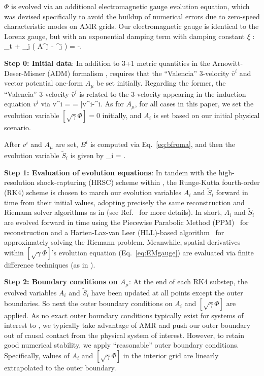 $\Phi$ is evolved via an additional electromagnetic gauge evolution
equation, which was devised specifically to avoid the buildup of
numerical errors due to zero-speed characteristic modes \cite{Etienne:2011re} on AMR grids. 
Our electromagnetic gauge is identical to the Lorenz gauge, but with an exponential
damping term with damping constant $\xi$ \cite{Farris:2012ux}:
\beq
\label{eq:EMgauge}
\partial_t \left[\sqrt{\gamma} \Phi \right] +
\partial_j \left(\alpha \sqrt{\gamma} A^j - \beta^j \left[\sqrt{\gamma} \Phi \right]\right)
= -\xi \alpha \left[\sqrt{\gamma}\Phi\right].
\eeq

{\bf Step 0: Initial data}: In addition to 3+1 metric quantities in
the Arnowitt-Deser-Misner (ADM) formalism \cite{Arnowitt:1959},
\GiR{} requires that the ``Valencia'' 3-velocity $\bar{v}^i$ and vector
potential one-form $A_\mu$ be set initially. Regarding the former, the
``Valencia'' 3-velocity $\bar{v}^i$ is related to the 3-velocity
appearing in the induction equation $v^i$ via 
\beq
v^i =  = \alpha \bar{v}^i-\beta^i.
\eeq
As for $A_\mu$, for all cases in this paper, we set the evolution
variable $\left[\sqrt{\gamma}\Phi\right]=0$ initially, and $A_i$ is
set based on our initial physical scenario.

After $v^i$ and $A_\mu$ are set, $B^i$ is computed via
Eq.~\ref{eq:bfroma}, and then the evolution variable $\tilde{S}_i$ is
given by
\beq
\label{eq:Sfromv}
_i = .
\eeq

{\bf Step 1: Evaluation of evolution equations}: In tandem with the
high-resolution shock-capturing (HRSC) scheme within \GiR, the
Runge-Kutta fourth-order (RK4) scheme is chosen to march
our evolution variables $A_i$ and $\tilde{S}_i$ forward in time from
their initial values, adopting precisely the same reconstruction and
Riemann solver algorithms as in \IGM{}  (see Ref.~\cite{Etienne:2015cea}
for more details). In short, $A_i$ and $\tilde{S}_i$ are evolved
forward in time using the Piecewise Parabolic Method
(PPM)~\cite{Colella:1984} for reconstruction and a Harten-Lax-van Leer
(HLL)-based algorithm~\cite{Harten:1983,DelZanna:2003} for
approximately solving the Riemann problem. Meanwhile, spatial
derivatives within $\left[\sqrt{\gamma}\Phi\right]$'s evolution
equation (Eq.~\ref{eq:EMgauge}) are evaluated via finite difference
techniques (as in \IGM).

{\bf Step 2: Boundary conditions on $A_\mu$}: At the end of each RK4
substep, the evolved variables $A_i$ and $\tilde{S}_i$ have been
updated at all points except the outer boundaries. So next the
outer boundary conditions on $A_i$ and
$\left[\sqrt{\gamma}\Phi\right]$ are applied. As no exact outer
boundary conditions typically exist for systems of interest to \GiR,
we typically take advantage of AMR and push our outer boundary out of
causal contact from the physical system of interest. However, to retain
good numerical stability, we apply ``reasonable'' outer boundary
conditions. Specifically, values of $A_i$ and
$\left[\sqrt{\gamma}\Phi\right]$ in the interior grid are linearly
extrapolated to the outer boundary.

